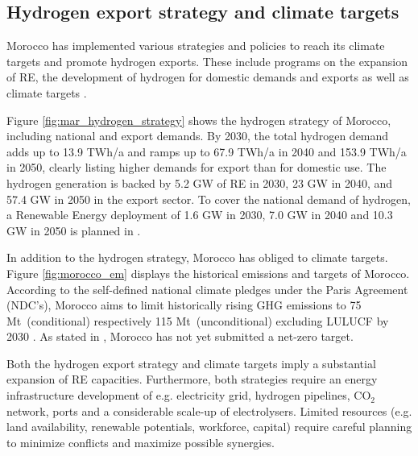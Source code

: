 \subsection*{Hydrogen export strategy and climate targets}

Morocco has implemented various strategies and policies to reach its climate targets and promote hydrogen exports. These include programs on the expansion of RE, the development of hydrogen for domestic demands and exports as well as climate targets \cite{MarHyStrat2021, CAT2021}.


Figure \ref{fig:mar_hydrogen_strategy} shows the hydrogen strategy of Morocco, including national and export demands.
By 2030, the total hydrogen demand adds up to 13.9 TWh/a and ramps up to 67.9 TWh/a in 2040 and 153.9 TWh/a in 2050, 
clearly listing higher demands for export than for domestic use. The hydrogen generation is backed by 5.2 GW of RE in 2030, 23 GW in 2040, and 57.4 GW in 2050 in the export sector. To cover the national demand of hydrogen, a Renewable Energy deployment of 1.6 GW in 2030, 7.0 GW in 2040 and 10.3 GW in 2050 is planned in \cite{MarHyStrat2021}.


In addition to the hydrogen strategy, Morocco has obliged to climate targets. Figure \ref{fig:morocco_em} displays the historical emissions and targets of Morocco.
According to the self-defined national climate pledges under the Paris Agreement (NDC's), Morocco aims to limit historically rising GHG emissions to 75 Mt\coe\ (conditional) respectively 115 Mt\coe\ (unconditional) excluding LULUCF by 2030 \cite{CAT2021}. 
As stated in \cite{CAT2021}, Morocco has not yet submitted a net-zero target. 

Both the hydrogen export strategy and climate targets imply a substantial expansion of RE capacities. Furthermore, both strategies require an energy infrastructure development of e.g. electricity grid, hydrogen pipelines, $\mathrm{CO_2}$ network, ports and a considerable scale-up of electrolysers.
Limited resources (e.g. land availability, renewable potentials, workforce, capital) require careful planning to minimize conflicts and maximize possible synergies.

